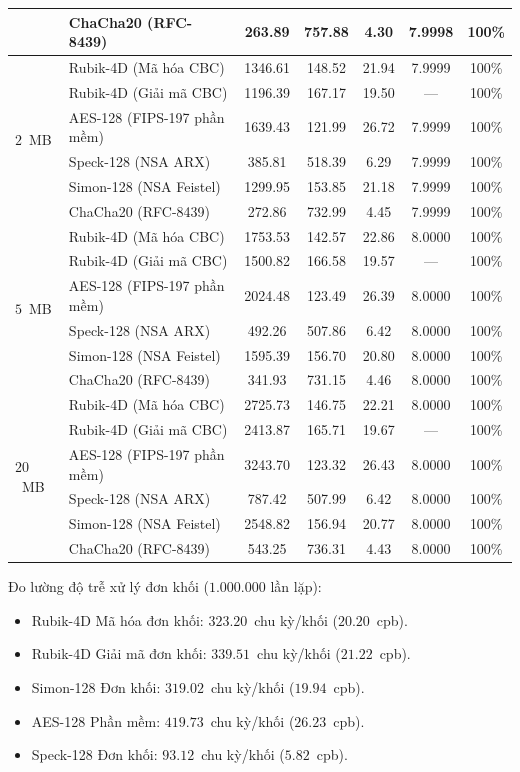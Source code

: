 \documentclass[10pt,twocolumn]{article}
\begin{document}
\begin{table}[t]
{\begin{tabular}{@{}llccccc@{}}
 & ChaCha20 (RFC-8439)          & 263.89  & 757.88 & 4.30  & 7.9998 & 100\% \\ \midrule
\multirow{6}{*}{$2$~MB} 
 & Rubik-4D (Mã hóa CBC)        & 1346.61 & 148.52 & 21.94 & 7.9999 & 100\% \\
 & Rubik-4D (Giải mã CBC)        & 1196.39 & 167.17 & 19.50 & --- & 100\% \\
 & AES-128 (FIPS-197 phần mềm)   & 1639.43 & 121.99 & 26.72 & 7.9999 & 100\% \\
 & Speck-128 (NSA ARX)          & 385.81  & 518.39 & 6.29  & 7.9999 & 100\% \\
 & Simon-128 (NSA Feistel)      & 1299.95 & 153.85 & 21.18 & 7.9999 & 100\% \\
 & ChaCha20 (RFC-8439)          & 272.86  & 732.99 & 4.45  & 7.9999 & 100\% \\ \midrule
\multirow{6}{*}{$5$~MB} 
 & Rubik-4D (Mã hóa CBC)        & 1753.53 & 142.57 & 22.86 & 8.0000 & 100\% \\
 & Rubik-4D (Giải mã CBC)        & 1500.82 & 166.58 & 19.57 & --- & 100\% \\
 & AES-128 (FIPS-197 phần mềm)   & 2024.48 & 123.49 & 26.39 & 8.0000 & 100\% \\
 & Speck-128 (NSA ARX)          & 492.26  & 507.86 & 6.42  & 8.0000 & 100\% \\
 & Simon-128 (NSA Feistel)      & 1595.39 & 156.70 & 20.80 & 8.0000 & 100\% \\
 & ChaCha20 (RFC-8439)          & 341.93  & 731.15 & 4.46  & 8.0000 & 100\% \\ \midrule
\multirow{6}{*}{$20$~MB} 
 & Rubik-4D (Mã hóa CBC)        & 2725.73 & 146.75 & 22.21 & 8.0000 & 100\% \\
 & Rubik-4D (Giải mã CBC)        & 2413.87 & 165.71 & 19.67 & --- & 100\% \\
 & AES-128 (FIPS-197 phần mềm)   & 3243.70 & 123.32 & 26.43 & 8.0000 & 100\% \\
 & Speck-128 (NSA ARX)          & 787.42  & 507.99 & 6.42  & 8.0000 & 100\% \\
 & Simon-128 (NSA Feistel)      & 2548.82 & 156.94 & 20.77 & 8.0000 & 100\% \\
 & ChaCha20 (RFC-8439)          & 543.25  & 736.31 & 4.43  & 8.0000 & 100\% \\ \bottomrule
\end{tabular}%
}
\end{table}

Đo lường độ trễ xử lý đơn khối ($1.000.000$ lần lặp):
\begin{itemize}
    \item Rubik-4D Mã hóa đơn khối: $323.20$~chu kỳ/khối ($20.20$~cpb).
    \item Rubik-4D Giải mã đơn khối: $339.51$~chu kỳ/khối ($21.22$~cpb).
    \item Simon-128 Đơn khối: $319.02$~chu kỳ/khối ($19.94$~cpb).
    \item AES-128 Phần mềm: $419.73$~chu kỳ/khối ($26.23$~cpb).
    \item Speck-128 Đơn khối: $93.12$~chu kỳ/khối ($5.82$~cpb).
\end{itemize}
\end{document}
